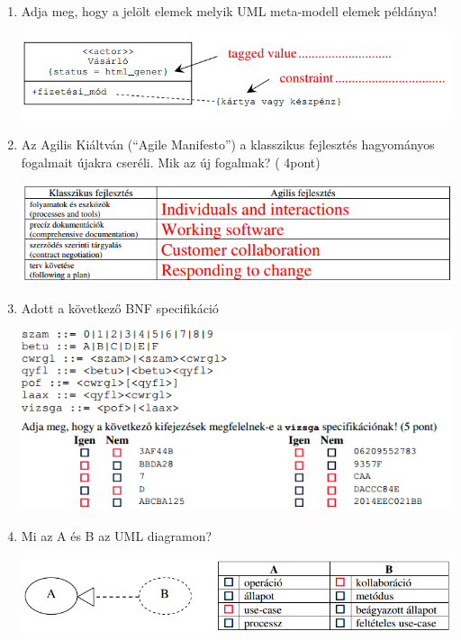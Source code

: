 \begin{enumerate}
	\item Adja meg, hogy a jelölt elemek melyik UML meta-modell elemek példánya!

		\begin{center}
			\includegraphics[scale=0.7]{img/table8}
		\end{center}

	\item Az Agilis Kiáltván (``Agile Manifesto'') a klasszikus fejlesztés hagyományos fogalmait újakra cseréli. Mik az új fogalmak? ( 4pont)

		\begin{center}
			\includegraphics[scale=0.7]{img/table9}
		\end{center}

	\item Adott a következő BNF specifikáció

		\begin{center}
			\includegraphics[scale=0.7]{img/table10}
		\end{center}

	\item Mi az A és B az UML diagramon?

		\begin{center}
			\includegraphics[scale=0.7]{img/table11}
		\end{center}


\end{enumerate}
